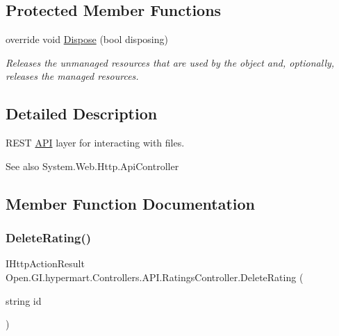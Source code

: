 \subsection*{Protected Member Functions}
\begin{DoxyCompactItemize}
\item 
override void \hyperlink{class_open_1_1_g_i_1_1hypermart_1_1_controllers_1_1_a_p_i_1_1_ratings_controller_abb9f3f53bdc7109192217e3dc99532a7}{Dispose} (bool disposing)
\begin{DoxyCompactList}\small\item\em Releases the unmanaged resources that are used by the object and, optionally, releases the managed resources. \end{DoxyCompactList}\end{DoxyCompactItemize}


\subsection{Detailed Description}
R\+E\+ST \hyperlink{namespace_open_1_1_g_i_1_1hypermart_1_1_controllers_1_1_a_p_i}{A\+PI} layer for interacting with files. 

\begin{DoxySeeAlso}{See also}
System.\+Web.\+Http.\+Api\+Controller


\end{DoxySeeAlso}


\subsection{Member Function Documentation}
\hypertarget{class_open_1_1_g_i_1_1hypermart_1_1_controllers_1_1_a_p_i_1_1_ratings_controller_aaf06db00da369f94fb3bffbc05a3491f}{}\label{class_open_1_1_g_i_1_1hypermart_1_1_controllers_1_1_a_p_i_1_1_ratings_controller_aaf06db00da369f94fb3bffbc05a3491f} 
\subsubsection{\texorpdfstring{Delete\+Rating()}{DeleteRating()}}
{\footnotesize\ttfamily I\+Http\+Action\+Result Open.\+G\+I.\+hypermart.\+Controllers.\+A\+P\+I.\+Ratings\+Controller.\+Delete\+Rating (\begin{DoxyParamCaption}\item[{string}]{id }\end{DoxyParamCaption})}



